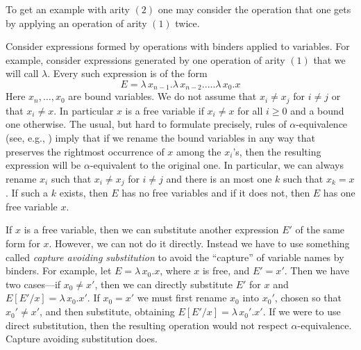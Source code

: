 \documentclass[12pt]{amsart}
\begin{document}
To get an example with arity $(2)$ one may consider the operation that one gets by applying an operation of arity $(1)$ twice.

Consider expressions formed by operations with binders applied to
variables. For example, consider expressions generated by one operation of
arity $(1)$ that we will call $\lambda$. Every such expression is of the form
%
$$E=\lambda\,x_{n-1}.\lambda\,x_{n-2}.\dots.\lambda\,x_0.x$$
%
Here $x_n,\dots,x_{0}$ are bound variables. We do not assume that $x_i\ne x_j$
for $i\ne j$ or that $x_i\ne x$. In particular $x$ is a free variable if
$x_i\ne x$ for all $i\ge 0$ and a bound one otherwise. The usual, but hard to
formulate precisely, rules of $\alpha$-equivalence (see, e.g., \cite[Def. 2.1.11,
  p.~26]{Barendregt}) imply that if we rename the bound variables in any way
that preserves the rightmost occurrence of $x$ among the $x_i$'s, then the
resulting expression will be $\alpha$-equivalent to the original one. In
particular, we can always rename $x_i$ such that $x_i\ne x_j$ for $i\ne j$ and
there is an most one $k$ such that $x_k=x$. If such a $k$ exists, then $E$ has
no free variables and if it does not, then $E$ has one free variable $x$.

If $x$ is a free variable, then we can substitute another expression $E'$ of the
same form for $x$. However, we can not do it directly. Instead we have to use
something called {\em capture avoiding substitution} to avoid the
``capture'' of variable names by binders. For example, let $E=\lambda\,x_0.x$,
where $x$ is free, and $E'=x'$. Then we have two cases---if $x_0\ne x'$, then we
can directly substitute $E'$ for $x$ and $E[E'/x]=\lambda\,x_0.x'$. If $x_0=x'$
we must first rename $x_0$ into $x_0'$, chosen so that $x_0'\ne x'$, and then
substitute, obtaining $E[E'/x]=\lambda\,x_0'.x'$. If we were to use direct
substitution, then the resulting operation would not respect 
$\alpha$-equivalence.  Capture avoiding substitution does.
\end{document}
